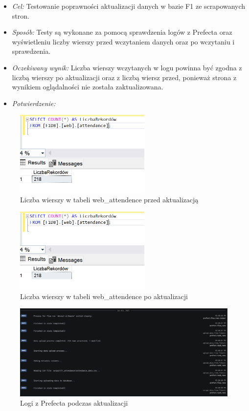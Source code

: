 \documentclass[12pt]{article}
\begin{document}
\begin{itemize}
    \item \textit{Cel:} Testowanie poprawności aktualizacji danych w bazie F1 ze scrapowanych stron.
    \item \textit{Sposób:}
    Testy są wykonane za pomocą sprawdzenia logów z Prefecta oraz wyświetleniu liczby wierszy przed wczytaniem danych oraz po wczytaniu i sprawdzenia.
     \item \textit{Oczekiwany wynik:}
     Liczba wierszy wczytanych w logu powinna być zgodna z liczbą wierszy po aktualizacji oraz z liczbą wiersz przed, ponieważ strona z wynikiem oglądalności nie została zaktualizowana.
      \item \textit{Potwierdzenie:}
\end{itemize}

\begin{figure}[H]
    \centering   \includegraphics[width=0.6\textwidth]{test7.png}
    \caption{Liczba wierszy w tabeli web\_attendence przed aktualizacją}
\end{figure}


\begin{figure}[H]
    \centering   \includegraphics[width=0.6\textwidth]{test7.png}
    \caption{Liczba wierszy w tabeli web\_attendence po aktualizacji}
\end{figure}

\begin{figure}[H]
    \centering   \includegraphics[width=\textwidth]{test8.png}
    \caption{Logi z Prefecta podczas aktualizacji}
\end{figure}
\end{document}
